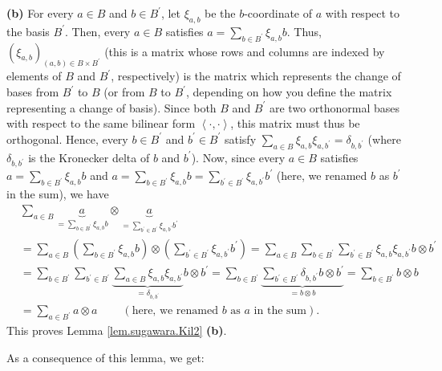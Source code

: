 \documentclass[etingof-lie.tex]{subfiles}
\begin{document}
\textbf{(b)} For every $a\in B$ and $b\in B^{\prime}$, let $\xi_{a,b}$ be the
$b$-coordinate of $a$ with respect to the basis $B^{\prime}$. Then, every
$a\in B$ satisfies $a=\sum\limits_{b\in B^{\prime}}\xi_{a,b}b$. Thus, $\left(
\xi_{a,b}\right)  _{\left(  a,b\right)  \in B\times B^{\prime}}$ (this is a
matrix whose rows and columns are indexed by elements of $B$ and $B^{\prime}$,
respectively) is the matrix which represents the change of bases from
$B^{\prime}$ to $B$ (or from $B$ to $B^{\prime}$, depending on how you define
the matrix representing a change of basis). Since both $B$ and $B^{\prime}$
are two orthonormal bases with respect to the same bilinear form $\left\langle
\cdot,\cdot\right\rangle $, this matrix must thus be orthogonal. Hence, every
$b\in B^{\prime}$ and $b^{\prime}\in B^{\prime}$ satisfy $\sum\limits_{a\in
B}\xi_{a,b}\xi_{a,b^{\prime}}=\delta_{b,b^{\prime}}$ (where $\delta
_{b,b^{\prime}}$ is the Kronecker delta of $b$ and $b^{\prime}$). Now, since
every $a\in B$ satisfies $a=\sum\limits_{b\in B^{\prime}}\xi_{a,b}b$ and
$a=\sum\limits_{b\in B^{\prime}}\xi_{a,b}b=\sum\limits_{b^{\prime}\in
B^{\prime}}\xi_{a,b^{\prime}}b^{\prime}$ (here, we renamed $b$ as $b^{\prime}$
in the sum), we have%
\begin{align*}
&  \sum\limits_{a\in B}\underbrace{a}_{=\sum\limits_{b\in B^{\prime}}\xi
_{a,b}b}\otimes\underbrace{a}_{=\sum\limits_{b^{\prime}\in B^{\prime}}%
\xi_{a,b^{\prime}}b^{\prime}}\\
&  =\sum\limits_{a\in B}\left(  \sum\limits_{b\in B^{\prime}}\xi
_{a,b}b\right)  \otimes\left(  \sum\limits_{b^{\prime}\in B^{\prime}}%
\xi_{a,b^{\prime}}b^{\prime}\right)  =\sum\limits_{a\in B}\sum\limits_{b\in
B^{\prime}}\sum\limits_{b^{\prime}\in B^{\prime}}\xi_{a,b}\xi_{a,b^{\prime}%
}b\otimes b^{\prime}\\
&  =\sum\limits_{b\in B^{\prime}}\sum\limits_{b^{\prime}\in B^{\prime}%
}\underbrace{\sum\limits_{a\in B}\xi_{a,b}\xi_{a,b^{\prime}}}_{=\delta
_{b,b^{\prime}}}b\otimes b^{\prime}=\sum\limits_{b\in B^{\prime}%
}\underbrace{\sum\limits_{b^{\prime}\in B^{\prime}}\delta_{b,b^{\prime}%
}b\otimes b^{\prime}}_{=b\otimes b}=\sum\limits_{b\in B^{\prime}}b\otimes b\\
&  =\sum\limits_{a\in B^{\prime}}a\otimes a\ \ \ \ \ \ \ \ \ \ \left(
\text{here, we renamed }b\text{ as }a\text{ in the sum}\right)  .
\end{align*}
This proves Lemma \ref{lem.sugawara.Kil2} \textbf{(b)}.

As a consequence of this lemma, we get:
\end{document}
